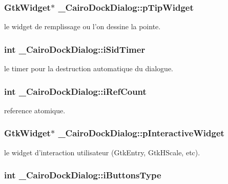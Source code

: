 \subsubsection{\setlength{\rightskip}{0pt plus 5cm}GtkWidget$\ast$ {\bf \_\-CairoDockDialog::pTipWidget}}\label{struct__CairoDockDialog_d349a7e1ba29e31aeaa54af138a47034}


le widget de remplissage ou l'on dessine la pointe. 

\subsubsection{\setlength{\rightskip}{0pt plus 5cm}int {\bf \_\-CairoDockDialog::iSidTimer}}\label{struct__CairoDockDialog_c2a5f7474f0cf02a3778bd37b6140227}


le timer pour la destruction automatique du dialogue. 

\subsubsection{\setlength{\rightskip}{0pt plus 5cm}int {\bf \_\-CairoDockDialog::iRefCount}}\label{struct__CairoDockDialog_e512616f06d60adbda900b2776498266}


reference atomique. 

\subsubsection{\setlength{\rightskip}{0pt plus 5cm}GtkWidget$\ast$ {\bf \_\-CairoDockDialog::pInteractiveWidget}}\label{struct__CairoDockDialog_fd4044e9e69ad85b92a1b9dd56bd1a8e}


le widget d'interaction utilisateur (GtkEntry, GtkHScale, etc). 

\subsubsection{\setlength{\rightskip}{0pt plus 5cm}int {\bf \_\-CairoDockDialog::iButtonsType}}\label{struct__CairoDockDialog_74c115eb02745de3396eec6697ffc43b}


